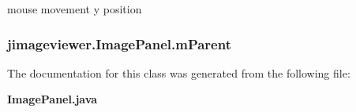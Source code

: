 mouse movement y position 

\subsubsection{ {\bf jimageviewer.Image\-Panel.m\-Parent}\hspace{0.3cm}{\tt  [package]}}\label{classjimageviewer_1_1_image_panel_42dd44bc296884031f3392cf83fc761b}




The documentation for this class was generated from the following file:\begin{CompactItemize}
\item 
{\bf Image\-Panel.java}\end{CompactItemize}
